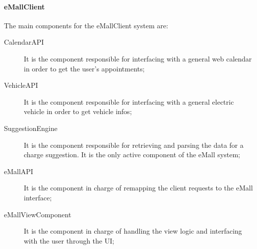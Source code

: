 \paragraph{\textbf{\ac{eMall}Client}}
The main components for the \ac{eMall}Client system are:
\begin{description}
    \item [\label{CalendarAPI}CalendarAPI] It is the component responsible for interfacing with a general web calendar in order to get the user's appointments;
    \item [\label{VehicleAPI}VehicleAPI] It is the component responsible for interfacing with a general electric vehicle in order to get vehicle infos;
    \item [\label{SuggestionEngine}SuggestionEngine] It is the component responsible for retrieving and parsing the data for a charge suggestion. It is the only active component of the \ac{eMall} system;
    \item [\label{eMallAPI}eMallAPI] It is the component in charge of remapping the client requests to the \ac{eMall} interface;
    \item [\label{eMallViewComponent}eMallViewComponent] It is the component in charge of handling the view logic and interfacing with the user through the \ac{UI};
\end{description}

